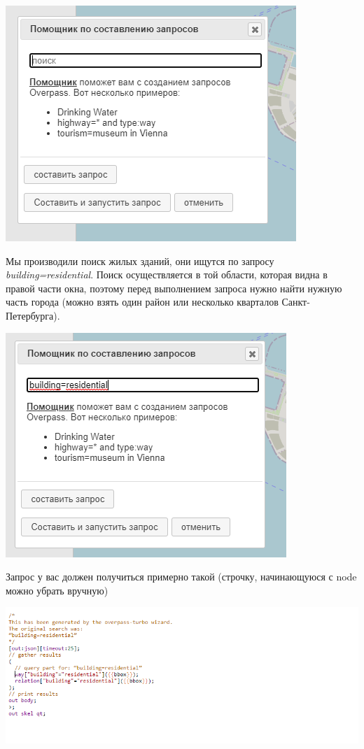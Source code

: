 \documentclass[
]{book}
\begin{document}
\includegraphics{figures/33.png}

Мы производили поиск жилых зданий, они ищутся по запросу \emph{building=residential}. Поиск осуществляется в той области, которая видна в правой части окна, поэтому перед выполнением запроса нужно найти нужную часть города (можно взять один район или несколько кварталов Санкт-Петербурга).

\includegraphics{figures/34.png}

Запрос у вас должен получиться примерно такой (строчку, начинающуюся с node можно убрать вручную)

\includegraphics{figures/35.png}
\end{document}
